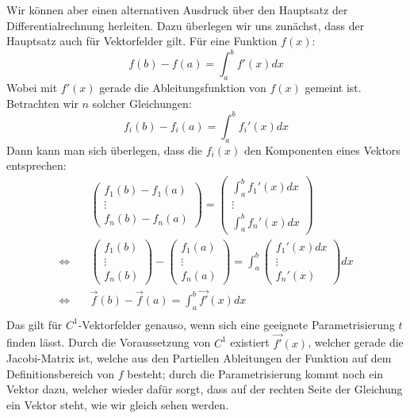 \documentclass[a4paper,german,12pt,smallheadings]{scrartcl}
\begin{document}
Wir können aber einen alternativen Ausdruck über den Hauptsatz der Differentialrechnung herleiten. Dazu überlegen wir uns zunächst, dass der Hauptsatz auch für Vektorfelder gilt. Für eine Funktion $f(x)$:
\begin{equation*}
f(b)-f(a)=\int_{a}^{b}f'(x)dx
\end{equation*}
Wobei mit $f'(x)$ gerade die Ableitungsfunktion von $f(x)$ gemeint ist. Betrachten wir $n$ solcher Gleichungen:
\begin{equation*}
f_i(b)-f_i(a)=\int_{a}^{b}f_i'(x)dx
\end{equation*}
Dann kann man sich überlegen, dass die $f_i(x)$ den Komponenten eines Vektors entsprechen:
\begin{align*}
&\begin{pmatrix}
f_1(b)-f_1(a)\\\vdots\\ f_n(b)-f_n(a)\end{pmatrix}
=\begin{pmatrix}
\int_{a}^{b}f_1'(x)dx\\\vdots\\\int_{a}^{b}f_n'(x)dx
\end{pmatrix}\\
\Leftrightarrow \quad &\begin{pmatrix}
f_1(b)\\\vdots\\f_n(b)
\end{pmatrix}-\begin{pmatrix}
f_1(a)\\\vdots\\f_n(a)
\end{pmatrix}=\int_{a}^{b}\begin{pmatrix}
f_1'(x)dx\\\vdots\\f_n'(x)
\end{pmatrix}
dx\\
\Leftrightarrow \quad &\vec{f}(b)-\vec{f}(a)=\int_{a}^{b}\vec{f'}(x)dx\\
\end{align*}
Das gilt für $C^1$-Vektorfelder genauso, wenn sich eine geeignete Parametrisierung $t$ finden lässt. Durch die Voraussetzung von $C^1$ existiert $\vec{f'}(x)$, welcher gerade die Jacobi-Matrix ist, welche aus den Partiellen Ableitungen der Funktion auf dem Definitionsbereich von $f$ besteht; durch die Parametrisierung kommt noch ein Vektor dazu, welcher wieder dafür sorgt, dass auf der rechten Seite der Gleichung ein Vektor steht, wie wir gleich sehen werden.
\end{document}

